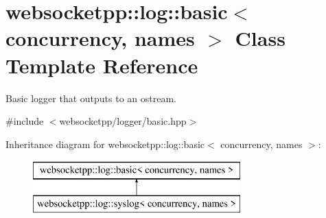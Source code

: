 \hypertarget{classwebsocketpp_1_1log_1_1basic}{}\section{websocketpp\+:\+:log\+:\+:basic$<$ concurrency, names $>$ Class Template Reference}
\label{classwebsocketpp_1_1log_1_1basic}


Basic logger that outputs to an ostream.  




{\ttfamily \#include $<$websocketpp/logger/basic.\+hpp$>$}

Inheritance diagram for websocketpp\+:\+:log\+:\+:basic$<$ concurrency, names $>$\+:\begin{figure}[H]
\begin{center}
\leavevmode
\includegraphics[height=2.000000cm]{classwebsocketpp_1_1log_1_1basic}
\end{center}
\end{figure}
